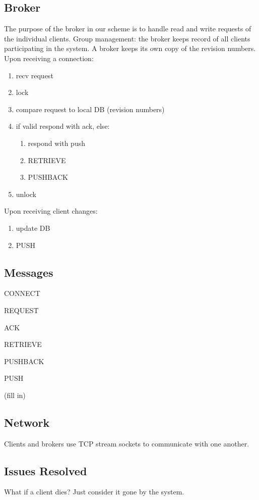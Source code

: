 \subsection{Broker}
The purpose of the broker in our scheme is to handle read and write requests of the individual clients. 
Group management: the broker keeps record of all clients participating in the system.
A broker keeps its own copy of the revision numbers.
\newline\newline
Upon receiving a connection:
\begin{enumerate}
\item recv request
\item lock
\item compare request to local DB (revision numbers)
\item if valid respond with ack, else:
  \begin{enumerate}
    \item respond with push
    \item RETRIEVE
    \item PUSHBACK
\end{enumerate}
\item unlock
\end{enumerate}
Upon receiving client changes:
\begin{enumerate}
\item update DB
\item PUSH
\end{enumerate}

\subsection{Messages}
CONNECT

REQUEST

ACK

RETRIEVE

PUSHBACK

PUSH

(fill in)
\subsection{Network}
Clients and brokers use TCP stream sockets to communicate with one another.

\subsection{Issues Resolved}
What if a client dies? Just consider it gone by the system.

